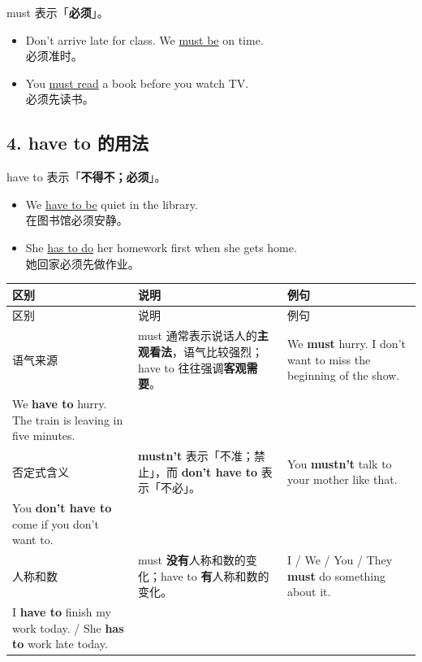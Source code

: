 \documentclass[11pt,a4paper]{ctexart}
\begin{document}
must 表示「\textbf{必须}」。

\begin{itemize}[leftmargin=1.4em]
\item Don’t arrive late for class. We \underline{must be} on time.\\ 必须准时。
\item You \underline{must read} a book before you watch TV.\\ 必须先读书。
\end{itemize}

\subsection*{4. have to 的用法}

have to 表示「\textbf{不得不；必须}」。

\begin{itemize}[leftmargin=1.4em]
\item We \underline{have to be} quiet in the library.\\ 在图书馆必须安静。
\item She \underline{has to do} her homework first when she gets home.\\ 她回家必须先做作业。
\end{itemize}

{\footnotesize
\begin{longtable}{p{4.47cm}p{4.47cm}p{4.47cm}}
\hline
区别 & 说明 & 例句 \\
\hline
\endfirsthead
\hline
区别 & 说明 & 例句 \\
\hline
\endhead
\hline
\endfoot
语气来源 & must 通常表示说话人的\textbf{主观看法}，语气比较强烈；have to 往往强调\textbf{客观需要}。 & We \textbf{must} hurry. I don’t want to miss the beginning of the show.\\ We \textbf{have to} hurry. The train is leaving in five minutes. \\
否定式含义 & \textbf{mustn’t} 表示「不准；禁止」，而 \textbf{don’t have to} 表示「不必」。 & You \textbf{mustn’t} talk to your mother like that.\\ You \textbf{don’t have to} come if you don’t want to. \\
人称和数 & must \textbf{没有}人称和数的变化；have to \textbf{有}人称和数的变化。 & I / We / You / They \textbf{must} do something about it.\\ I \textbf{have to} finish my work today. / She \textbf{has to} work late today. \\
\end{longtable}
}
\end{document}
